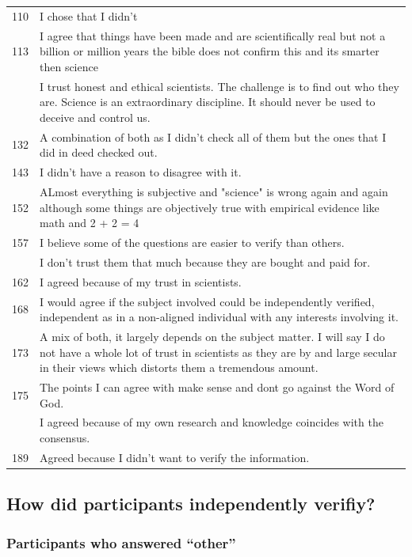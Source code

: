 \documentclass[
  doc,floatsintext]{apa6}
\begin{document}
\begin{longtable}[t]{>{}r>{\raggedright\arraybackslash}p{30em}}
110 & I chose that I didn’t\\
113 & I agree that things have been made and are scientifically real but not a billion or million years the bible does not confirm this and its smarter then science\\
\addlinespace
130 & I trust honest and ethical scientists.  The challenge is to find out who they are.  Science is an extraordinary discipline.  It should never be used to deceive and control us.\\
132 & A combination of both as I didn't check all of them but the ones that I did in deed checked out.\\
143 & I didn't have a reason to disagree with it.\\
152 & ALmost everything is subjective and "science" is wrong again and again although some things are objectively true with empirical evidence like math and 2 + 2 = 4\\
157 & I believe some of the questions are easier to verify than others.\\
\addlinespace
158 & I don't trust them that much because they are bought and paid for.\\
162 & I agreed because of my trust in scientists.\\
168 & I would agree if the subject involved could be independently verified, independent as in a non-aligned individual with any interests involving it.\\
173 & A mix of both, it largely depends on the subject matter. I will say I do not have a whole lot of trust in scientists as they are by and large secular in their views which distorts them a tremendous amount.\\
175 & The points I can agree with make sense and dont go against the Word of God.\\
\addlinespace
187 & I agreed because of my own research and knowledge coincides with the consensus.\\
189 & Agreed because I didn’t want to verify the information.\\
\bottomrule
\end{longtable}

\subsection{How did participants independently verifiy?}\label{how-did-participants-independently-verifiy-1}

\subsubsection{Participants who answered ``other''}\label{participants-who-answered-other-3}
\end{document}

